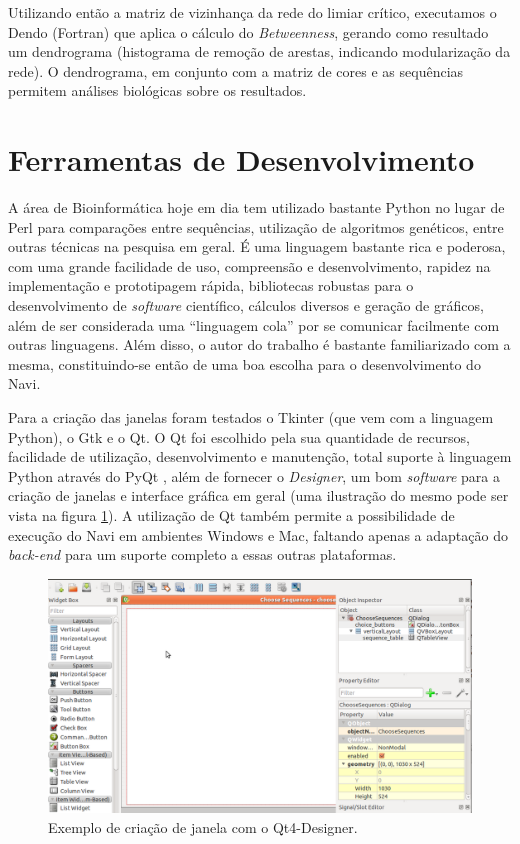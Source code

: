 Utilizando então a matriz de vizinhança da rede do limiar crítico, executamos o Dendo (Fortran) que aplica o cálculo do \textit{Betweenness}, gerando como
resultado um dendrograma (histograma de remoção de arestas, indicando modularização da rede). O dendrograma, em conjunto com a matriz de cores e as sequências
permitem análises biológicas sobre os resultados.

\section{Ferramentas de Desenvolvimento} \label{sec:ferramentas}

A área de Bioinformática hoje em dia tem utilizado bastante Python \cite{python} no lugar de Perl para comparações entre sequências, utilização de algoritmos
genéticos, entre outras técnicas na pesquisa em geral. É uma linguagem bastante rica e poderosa, com uma grande facilidade de uso, compreensão e
desenvolvimento, rapidez na implementação e prototipagem rápida, bibliotecas robustas para o desenvolvimento de \textit{software} científico, cálculos
diversos e geração de gráficos, além de ser considerada uma ``linguagem cola'' por se comunicar facilmente com outras linguagens. Além disso, o autor do
trabalho é bastante familiarizado com a mesma, constituindo-se então de uma boa escolha para o desenvolvimento do Navi.

Para a criação das janelas foram testados o Tkinter (que vem com a linguagem Python), o Gtk e o Qt. O Qt foi escolhido pela sua quantidade de recursos,
facilidade de utilização, desenvolvimento e manutenção, total suporte à linguagem Python através do PyQt \cite{pyqt}, além de fornecer o \textit{Designer},
um bom \textit{software} para a criação de janelas e interface gráfica em geral (uma ilustração do mesmo pode ser vista na figura \ref{fig:designer}).
A utilização de Qt também permite a possibilidade de execução do Navi em ambientes Windows e Mac, faltando apenas a adaptação do \textit{back-end} para um
suporte completo a essas outras plataformas.

\begin{figure}
\centering
\includegraphics[scale=0.38]{designer}
\caption{Exemplo de criação de janela com o Qt4-Designer.}
\label{fig:designer}
\end{figure}

